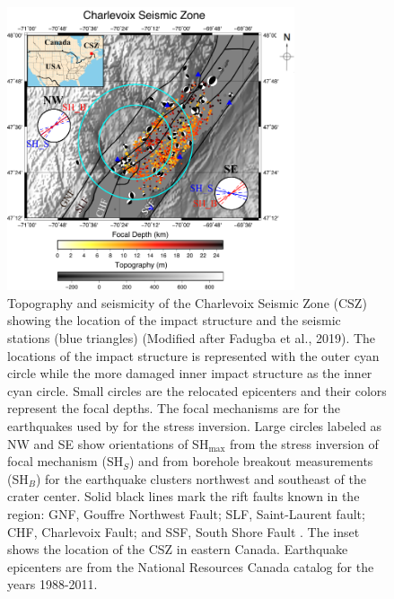 \documentclass[draft]{agujournal2018}
\begin{document}
\begin{figure}[h]
\centering
\includegraphics[width=20pc]{Figures/Map_of_CSV_now_w_sta.png} 
\caption{Topography and seismicity of the Charlevoix Seismic Zone (CSZ) showing the location of the impact structure and the seismic stations (blue triangles) (Modified after Fadugba et al., 2019). The locations of the impact structure is represented with the outer cyan circle while the more damaged inner impact structure as the inner cyan circle. Small circles are the relocated epicenters \citep{Powell_2017} and their colors represent the focal depths. The focal mechanisms are for the earthquakes used by \citet{Mazzotti_2010} for the stress inversion. Large circles labeled as NW and SE show orientations of SH$_{\max}$ from the stress inversion of focal mechanism (SH$_S$) and from borehole breakout measurements (SH$_B$) for the earthquake clusters northwest and southeast of the crater center. Solid black lines mark the rift faults known in the region: GNF, Gouffre Northwest Fault; SLF, Saint-Laurent fault; CHF, Charlevoix Fault; and SSF, South Shore Fault \citep{Rondot_1971,lamontagne1999}. The inset shows the location of the CSZ in eastern Canada. Earthquake epicenters are from the National Resources Canada catalog for the years 1988-2011.}
\label{figone}
\end{figure}
\end{document}
